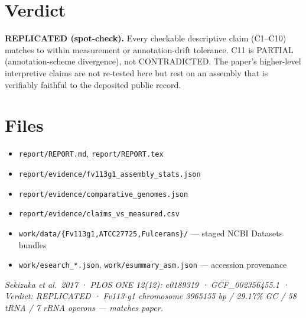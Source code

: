 \documentclass[11pt]{article}
\begin{document}
\section{Verdict}

\textbf{REPLICATED (spot-check).} Every checkable descriptive claim (C1--C10) matches to
within measurement or annotation-drift tolerance. C11 is PARTIAL (annotation-scheme
divergence), not CONTRADICTED. The paper's higher-level interpretive claims are not
re-tested here but rest on an assembly that is verifiably faithful to the deposited public
record.

\section{Files}
\begin{itemize}
  \item \texttt{report/REPORT.md}, \texttt{report/REPORT.tex}
  \item \texttt{report/evidence/fv113g1\_assembly\_stats.json}
  \item \texttt{report/evidence/comparative\_genomes.json}
  \item \texttt{report/evidence/claims\_vs\_measured.csv}
  \item \texttt{work/data/\{Fv113g1,ATCC27725,Fulcerans\}/} --- staged NCBI Datasets bundles
  \item \texttt{work/esearch\_*.json}, \texttt{work/esummary\_asm.json} --- accession provenance
\end{itemize}

\vspace{1em}
\noindent\emph{Sekizuka et al.\ 2017 · PLOS ONE 12(12): e0189319 · GCF\_002356455.1 ·
Verdict: REPLICATED · Fv113-g1 chromosome \num{3965155} bp / 29.17\% GC / 58 tRNA /
7 rRNA operons --- matches paper.}
\end{document}
